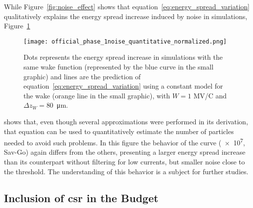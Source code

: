     While Figure~\ref{fig:noise_effect} shows that equation~\eqref{eq:energy_spread_variation} qualitatively explains the energy spread increase induced by noise in simulations, Figure~\ref{fig:quantitative_noise_effect}
    \begin{figure}
        \centering
        \texttt{[image: official\_phase\_1noise\_quantitative\_normalized.png]}
        \caption[Application of equation~\eqref{eq:energy_spread_variation} to account for energy spread increase.]{Dots represents the energy spread increase in simulations with the same wake function (represented by the blue curve in the small graphic) and lines are the prediction of equation~\eqref{eq:energy_spread_variation} using a constant model for the wake (orange line in the small graphic), with $W=1$ MV/C and $\Delta z_W = $\SI{80}{\micro\meter}.}
        \label{fig:quantitative_noise_effect}
    \end{figure}
    shows that, even though several approximations were performed in its derivation, that equation can be used to quantitatively estimate the number of particles needed to avoid such problems. In this figure the behavior of the curve (\num{e7}, Sav-Go) again differs from the others, presenting a larger energy spread increase than its counterpart without filtering for low currents, but smaller noise close to the threshold. The understanding of this behavior is a subject for further studies.

\subsection{Inclusion of \gls{csr} in the Budget}

